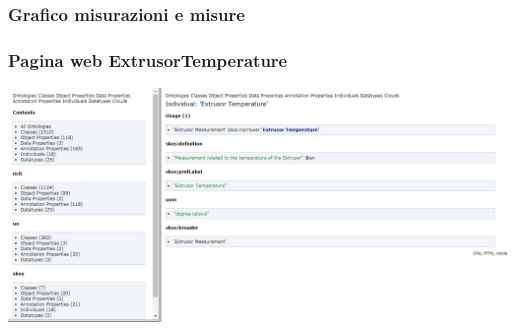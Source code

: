 \documentclass{beamer}
\begin{document}
\begin{frame}
\frametitle{Grafico misurazioni e misure}
\begin{figure}%
{}%
\hfill
{}%
%
%
\end{figure}
\end{frame}



\begin{frame}
\frametitle{Pagina web ExtrusorTemperature}
\includegraphics[width=1\textwidth]{images/ExtrusorTemperature2.png}
\end{frame}
\end{document}
